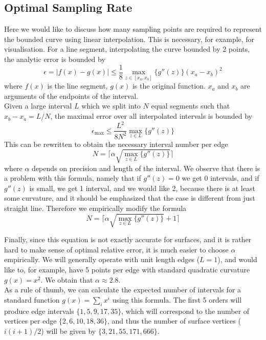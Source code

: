 \documentclass[12pt]{article}
\begin{document}
\subsection{Optimal Sampling Rate}

Here we would like to discuss how many sampling points are required to represent the bounded curve using linear interpolation. This is necessary, for example, for visualisation. For a line segment, interpolating the curve bounded by 2 points, the analytic error is bounded by
\begin{equation}
	\epsilon = |f(x) - g(x)| \leq \frac{1}{8} \max_{z \in [x_a, x_b]} \{ g''(z)  \} (x_a - x_b)^2
\end{equation}
\noindent
where $f(x)$ is the line segment, $g(x)$ is the original function. $x_a$ and $x_b$ are arguments of the endpoints of the interval. \\

\noindent
Given a large interval $L$ which we split into $N$ equal segments such that $x_b - x_a = L/N$, the maximal error over all interpolated intervals is bounded by
\begin{equation}
	\epsilon_{\max} \leq \frac{L^2}{8 N^2} \max_{z \in L} \{ g''(z) \}
\end{equation}
\noindent
This can be rewritten to obtain the necessary interval number per edge
\begin{equation}
	N = \biggl \lceil \alpha \sqrt{ \max_{z \in L} \{ g''(z) \} } \biggr \rceil
\end{equation}
\noindent
where $\alpha$ depends on precision and length of the interval. We observe that there is a problem with this formula, namely that if $g''(z) = 0$ we get 0 intervals, and if $g''(z)$ is small, we get 1 interval, and we would like 2, because there is at least some curvature, and it should be emphasized that the case is different from just straight line. Therefore we empirically modify the formula
\begin{equation}
	N = \biggl \lceil \alpha \sqrt{ \max_{z \in L} \{ g''(z) \} } + 1 \biggr \rceil
\end{equation}

\noindent
Finally, since this equation is not exactly accurate for surfaces, and it is rather hard to make sense of optimal relative error, it is much easier to choose $\alpha$ empirically. We will generally operate with unit length edges ($L = 1$), and would like to, for example, have 5 points per edge with standard quadratic curvature $g(x) = x^2$. We obtain that $\alpha \approx 2.8$. \\

\noindent
As a rule of thumb, we can calculate the expected number of intervals for a standard function $g(x) = \sum_i x^i$ using this formula. The first 5 orders will produce edge intervals $\{ 1, 5, 9, 17, 35\}$, which will correspond to the number of vertices per edge $\{ 2, 6, 10, 18, 36\}$, and thus the number of surface vertices ($i(i+1)/2$) will be given by $\{3, 21, 55, 171, 666\}$.
\end{document}
